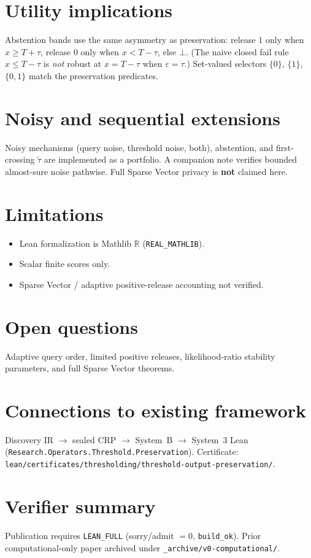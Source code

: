 \documentclass[11pt]{article}
\begin{document}
\section{Utility implications}
Abstention bands use the same asymmetry as preservation: release \(1\) only when
\(x\ge T+\tau\), release \(0\) only when \(x<T-\tau\), else \(\bot\).
(The naive closed fail rule \(x\le T-\tau\) is \emph{not} robust at \(x=T-\tau\) when
\(\varepsilon=\tau\).) Set-valued selectors \(\{0\}\), \(\{1\}\), \(\{0,1\}\) match
the preservation predicates.

\section{Noisy and sequential extensions}
Noisy mechanisms (query noise, threshold noise, both), abstention, and
first-crossing \(\widetilde\tau\) are implemented as a portfolio.
A companion note verifies bounded almost-sure noise pathwise.
Full Sparse Vector privacy is \textbf{not} claimed here.

\section{Limitations}
\begin{itemize}
\item Lean formalization is Mathlib $\mathbb{R}$ (\texttt{REAL\_MATHLIB}).
\item Scalar finite scores only.
\item Sparse Vector / adaptive positive-release accounting not verified.
\end{itemize}

\section{Open questions}
Adaptive query order, limited positive releases, likelihood-ratio stability
parameters, and full Sparse Vector theorems.

\section{Connections to existing framework}
Discovery IR \(\to\) sealed CRP \(\to\) System~B \(\to\) System~3 Lean
(\texttt{Research.Operators.Threshold.Preservation}).
Certificate:
\texttt{lean/certificates/thresholding/threshold-output-preservation/}.

\section{Verifier summary}
Publication requires \texttt{LEAN\_FULL} (sorry/admit \(=0\), \texttt{build\_ok}).
Prior computational-only paper archived under \texttt{\_archive/v0-computational/}.
\end{document}
